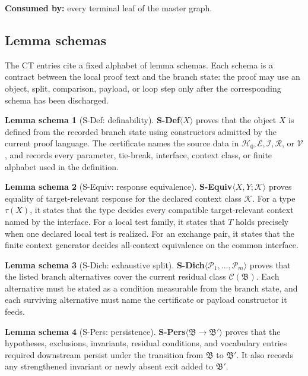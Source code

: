 \documentclass[
  11pt,
]{article}
\theoremstyle{definition}
\newtheorem{lemmaschema}{Lemma schema}[section]
\begin{document}
\noindent\textbf{Consumed by:} every terminal leaf of the master graph.

\subsection{Lemma schemas}\label{data-lemma-schemas}
The CT entries cite a fixed alphabet of lemma schemas.  Each schema is a
contract between the local proof text and the branch state: the proof may
use an object, split, comparison, payload, or loop step only after the
corresponding schema has been discharged.

\begin{lemmaschema}[S-Def: definability]\label{schema:s-def}
\textbf{S-Def}\(\langle X\rangle\) proves that the object \(X\) is
defined from the recorded branch state using constructors admitted by the
current proof language.  The certificate names the source data in
\(\mathcal H_0,\mathcal E,\mathcal I,\mathcal R\), or \(\mathcal V\),
and records every parameter, tie-break, interface, context class, or
finite alphabet used in the definition.
\end{lemmaschema}

\begin{lemmaschema}[S-Equiv: response equivalence]\label{schema:s-equiv}
\textbf{S-Equiv}\(\langle X,Y;\mathcal K\rangle\) proves equality of
target-relevant response for the declared context class \(\mathcal K\).
For a type \(\tau(X)\), it states that the type decides every compatible
target-relevant context named by the interface.  For a local test family,
it states that \(T\) holds precisely when one declared local test is
realized.  For an exchange pair, it states that the finite context
generator decides all-context equivalence on the common interface.
\end{lemmaschema}

\begin{lemmaschema}[S-Dich: exhaustive split]\label{schema:s-dich}
\textbf{S-Dich}\(\langle\mathcal P_1,\ldots,\mathcal P_m\rangle\)
proves that the listed branch alternatives cover the current residual
class \(\mathcal C(\mathfrak B)\).  Each alternative must be stated as a
condition measurable from the branch state, and each surviving
alternative must name the certificate or payload constructor it feeds.
\end{lemmaschema}

\begin{lemmaschema}[S-Pers: persistence]\label{schema:s-pers}
\textbf{S-Pers}\(\langle\mathfrak B\to\mathfrak B'\rangle\) proves that
the hypotheses, exclusions, invariants, residual conditions, and
vocabulary entries required downstream persist under the transition from
\(\mathfrak B\) to \(\mathfrak B'\).  It also records any strengthened
invariant or newly absent exit added to \(\mathfrak B'\).
\end{lemmaschema}
\end{document}
